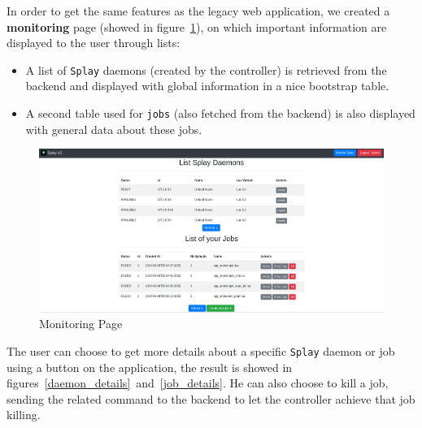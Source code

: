 \documentclass{eplmastersthesis}
\begin{document}
        In order to get the same features as the legacy web application,
        we created a \textbf{monitoring} page (showed in
        figure~\ref{monitor_web}), on which important
        information are displayed to the user through lists:

        \begin{itemize}
          \item A list of \texttt{Splay} daemons (created by the controller) is retrieved
          from the backend and displayed with global information in a nice
          bootstrap table.
          \item A second table used for \texttt{jobs} (also fetched from the backend) is also
          displayed with general data about these jobs.
        \end{itemize}

        \begin{figure}
          \centering
          \includegraphics[scale=0.27]{figures/monitor.png}
          \caption{\label{monitor_web} Monitoring Page}
        \end{figure}

        The user can choose to
        get more details about a specific \texttt{Splay} daemon or job using a button
        on the application, the result is showed in
        figures~\ref{daemon_details}~and~\ref{job_details}. He can also choose
        to kill a job, sending the related command to the backend to let the
        controller achieve that job killing.
\end{document}
